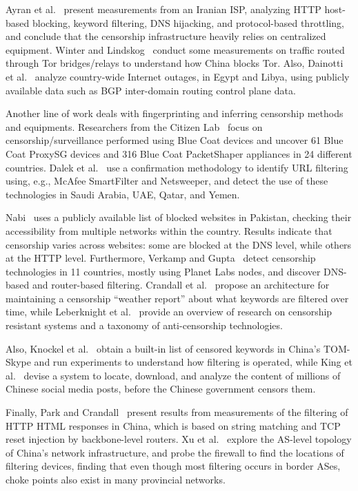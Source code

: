 \documentclass{sig-alternate-2013}
\begin{document}
Ayran et al.~\cite{aryan2013internet} present measurements from an Iranian ISP, analyzing HTTP host-based blocking, keyword filtering, DNS hijacking, and protocol-based throttling, and conclude that the censorship infrastructure heavily relies on centralized equipment. 
Winter and Lindskog~\cite{winter2012great} conduct 
some measurements on traffic routed through Tor bridges/relays to understand how China blocks Tor. Also, Dainotti et al.~\cite{dainotti2011analysis} analyze country-wide Internet outages, in Egypt and Libya, using publicly available data such as BGP inter-domain routing control plane data.

Another line of work deals with fingerprinting and inferring censorship methods and equipments. Researchers from the Citizen Lab~\cite{citizenlab}
focus on censorship/surveillance performed using Blue Coat devices
and uncover 61 Blue Coat ProxySG devices and 316 Blue Coat PacketShaper appliances in 
24 different countries.
Dalek et al.~\cite{dalek2013method} use a confirmation methodology to identify URL filtering using, e.g., McAfee SmartFilter and Netsweeper, and detect the use of these technologies in Saudi Arabia, UAE, Qatar, and Yemen.

Nabi~\cite{nabi2013anatomy} uses a publicly available list of blocked websites in Pakistan,  checking their accessibility from multiple networks within the country. Results indicate that censorship varies across websites: some are blocked at the DNS level, while others at the HTTP level.
Furthermore, Verkamp and Gupta~\cite{verkamp2012inferring} detect censorship technologies in 11 countries, mostly using Planet Labs nodes, and discover DNS-based and router-based filtering.
Crandall et al.~\cite{crandall2007conceptdoppler} propose an architecture for maintaining a censorship ``weather report'' about what keywords are filtered over time, while Leberknight et al.~\cite{leberknight2012taxonomy} provide an overview of research on censorship resistant systems and a taxonomy of anti-censorship technologies.

Also, Knockel et al.~\cite{knockel2011three} obtain a built-in list of censored keywords in China's TOM-Skype and run experiments to understand how filtering is operated, while
King et al.~\cite{king2012censorship} devise a system to locate, download, and analyze the content of millions of Chinese social media posts, before the Chinese government censors them. 

Finally, Park and Crandall~\cite{park2010empirical} present results from measurements of the filtering of HTTP HTML responses in China, which is based on string matching and TCP reset injection by backbone-level routers. Xu et al.~\cite{xu2011internet} explore the AS-level topology of China's network infrastructure, and probe the firewall to find the locations of filtering devices, finding that even though most filtering occurs in border ASes, choke points also exist in many provincial networks. 
\end{document}
